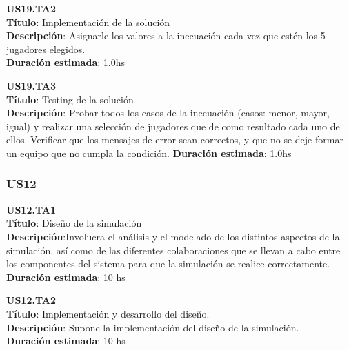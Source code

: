 \begin{tcolorbox}
\textbf{US19.TA2} \\
\textbf{Título}: Implementación de la solución \\
\textbf{Descripción}: Asignarle los valores a la inecuación cada vez que estén los 5 jugadores elegidos. \\
\textbf{Duración estimada}: 1.0hs
\end{tcolorbox}
\vspace{10pt}

\begin{tcolorbox}
\textbf{US19.TA3} \\
\textbf{Título}: Testing de la solución \\
\textbf{Descripción}: Probar todos los casos de la inecuación (casos: menor, mayor, igual) y realizar una selección de jugadores que de como resultado cada uno de ellos. Verificar que los mensajes de error sean correctos, y que no se deje formar un equipo que no cumpla la condición.
\textbf{Duración estimada}: 1.0hs
\end{tcolorbox}
\vspace{10pt}


\subsubsection*{\underline{US12}}

\begin{tcolorbox}
\textbf{US12.TA1} \\
\textbf{Título}: Diseño de la simulación\\
\textbf{Descripción}:Involucra el análisis y el modelado de los distintos aspectos de la simulación, así como de las diferentes colaboraciones que se llevan a cabo entre los componentes del sistema para que la simulación se realice correctamente.\\
\textbf{Duración estimada}: 10 hs
\end{tcolorbox}
\vspace{10pt}

\begin{tcolorbox}
\textbf{US12.TA2} \\
\textbf{Título}: Implementación y desarrollo del diseño.\\
\textbf{Descripción}: Supone la implementación del diseño de la simulación.\\
\textbf{Duración estimada}: 10 hs
\end{tcolorbox}
\vspace{10pt}

